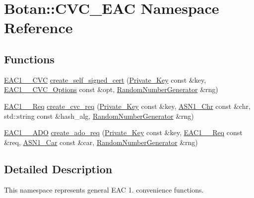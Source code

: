 \hypertarget{namespaceBotan_1_1CVC__EAC}{\section{Botan\-:\-:C\-V\-C\-\_\-\-E\-A\-C Namespace Reference}
\label{namespaceBotan_1_1CVC__EAC}
}
\subsection*{Functions}
\begin{DoxyCompactItemize}
\item 
\hyperlink{classBotan_1_1EAC1__1__CVC}{E\-A\-C1\-\_\-\_\-\-C\-V\-C} \hyperlink{namespaceBotan_1_1CVC__EAC_a048724e211010c6b9b9162220280a88f}{create\-\_\-self\-\_\-signed\-\_\-cert} (\hyperlink{classBotan_1_1Private__Key}{Private\-\_\-\-Key} const \&key, \hyperlink{classBotan_1_1EAC1__1__CVC__Options}{E\-A\-C1\-\_\-\_\-\-C\-V\-C\-\_\-\-Options} const \&opt, \hyperlink{classBotan_1_1RandomNumberGenerator}{Random\-Number\-Generator} \&rng)
\item 
\hyperlink{classBotan_1_1EAC1__1__Req}{E\-A\-C1\-\_\-\_\-\-Req} \hyperlink{namespaceBotan_1_1CVC__EAC_ac5b77ee0ccf8310b42fd77d4c1157745}{create\-\_\-cvc\-\_\-req} (\hyperlink{classBotan_1_1Private__Key}{Private\-\_\-\-Key} const \&key, \hyperlink{classBotan_1_1ASN1__Chr}{A\-S\-N1\-\_\-\-Chr} const \&chr, std\-::string const \&hash\-\_\-alg, \hyperlink{classBotan_1_1RandomNumberGenerator}{Random\-Number\-Generator} \&rng)
\item 
\hyperlink{classBotan_1_1EAC1__1__ADO}{E\-A\-C1\-\_\-\_\-\-A\-D\-O} \hyperlink{namespaceBotan_1_1CVC__EAC_a9a418aee5e7bc0f21507b36fb847f88f}{create\-\_\-ado\-\_\-req} (\hyperlink{classBotan_1_1Private__Key}{Private\-\_\-\-Key} const \&key, \hyperlink{classBotan_1_1EAC1__1__Req}{E\-A\-C1\-\_\-\_\-\-Req} const \&req, \hyperlink{classBotan_1_1ASN1__Car}{A\-S\-N1\-\_\-\-Car} const \&car, \hyperlink{classBotan_1_1RandomNumberGenerator}{Random\-Number\-Generator} \&rng)
\end{DoxyCompactItemize}


\subsection{Detailed Description}
This namespace represents general E\-A\-C 1. convenience functions. 

